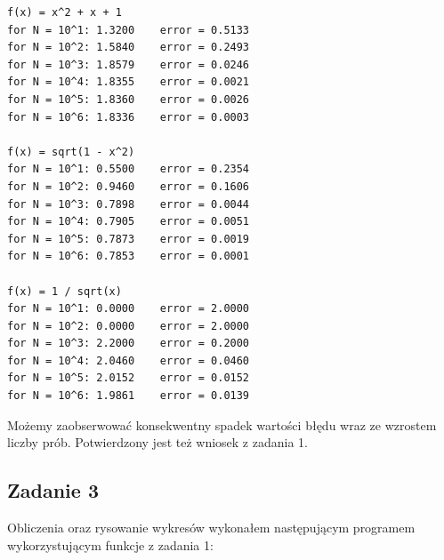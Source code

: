 \documentclass{article}
\begin{document}
\begin{verbatim}
f(x) = x^2 + x + 1
for N = 10^1: 1.3200    error = 0.5133
for N = 10^2: 1.5840    error = 0.2493
for N = 10^3: 1.8579    error = 0.0246
for N = 10^4: 1.8355    error = 0.0021
for N = 10^5: 1.8360    error = 0.0026
for N = 10^6: 1.8336    error = 0.0003

f(x) = sqrt(1 - x^2)
for N = 10^1: 0.5500    error = 0.2354
for N = 10^2: 0.9460    error = 0.1606
for N = 10^3: 0.7898    error = 0.0044
for N = 10^4: 0.7905    error = 0.0051
for N = 10^5: 0.7873    error = 0.0019
for N = 10^6: 0.7853    error = 0.0001

f(x) = 1 / sqrt(x)
for N = 10^1: 0.0000    error = 2.0000
for N = 10^2: 0.0000    error = 2.0000
for N = 10^3: 2.2000    error = 0.2000
for N = 10^4: 2.0460    error = 0.0460
for N = 10^5: 2.0152    error = 0.0152
for N = 10^6: 1.9861    error = 0.0139
\end{verbatim}
Możemy zaobserwować konsekwentny spadek wartości błędu wraz ze wzrostem liczby prób. Potwierdzony jest też wniosek z zadania 1.

\subsection{Zadanie 3}

Obliczenia oraz rysowanie wykresów wykonałem następującym programem wykorzystującym funkcje z zadania 1:
\end{document}
